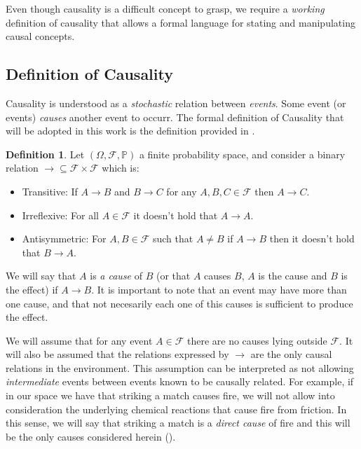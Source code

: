 \documentclass[english,letterpaper,12pt,final]{article}
\theoremstyle{definition}
\newtheorem{defi}{Definition}[section]
\begin{document}
Even though causality is a difficult concept to grasp, we require a \textit{working} definition of causality that allows a formal language for stating and manipulating causal concepts. 
	\subsection{Definition of Causality}
	Causality is understood as a \textit{stochastic} relation between \textit{events}. Some event (or events) \textit{causes} another event to occurr. 
	The formal definition of Causality that will be adopted in this work is the definition provided in \cite{spirtes2000causation}.
	\begin{defi}{\label{causal_relation}}
	Let $(\Omega, \mathcal{F}, \mathbb{P})$ a finite probability space, and consider a binary relation $\to \subseteq \mathcal{F} \times \mathcal{F}$ which is:
	\begin{itemize}
	\item Transitive: If $A \to B$ and $B \to C$ for any $A, B, C \in \mathcal{F}$ then $A \to C$.
	\item Irreflexive: For all $A \in \mathcal{F}$ it doesn't hold that $A \to A$.
	\item Antisymmetric: For $A,B \in \mathcal{F}$ such that $A \neq B$ if $A \to B$ then it doesn't hold that $B \to A$.
	\end{itemize}
	We will say that $A$ is \textit{a cause} of $B$ (or that $A$ causes $B$, $A$ is the cause and $B$ is the effect) if $A \to B$. It is important to note that an event may have more than one cause, and that not necesarily each one of this causes is sufficient to produce the effect. 
	\end{defi}
	We will assume that for any event $A \in \mathcal{F}$ there are no causes lying outside $\mathcal{F}$. It will also be assumed that the relations expressed by $\to$ are the only causal relations in the environment. This assumption can be interpreted as not allowing \textit{intermediate} events between events known to be causally related. For example, if in our space we have that striking a match causes fire, we will not allow into consideration the underlying chemical reactions that cause fire from friction. In this sense, we will say that striking a match is a \textit{direct cause} of fire and this will be the only causes considered herein (\cite{spirtes2000causation}). 
\end{document}
